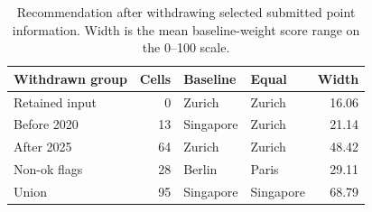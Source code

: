 \begin{table}[!ht]\centering
\caption{Recommendation after withdrawing selected submitted point information. Width is the mean baseline-weight score range on the 0--100 scale.}\label{tab:vintage}
\begin{tabular}{l r l l r}\toprule
Withdrawn group & Cells & Baseline & Equal & Width\\\midrule
Retained input & 0 & Zurich & Zurich & 16.06 \\
Before 2020 & 13 & Singapore & Zurich & 21.14 \\
After 2025 & 64 & Zurich & Zurich & 48.42 \\
Non-ok flags & 28 & Berlin & Paris & 29.11 \\
Union & 95 & Singapore & Singapore & 68.79 \\
\bottomrule\end{tabular}\end{table}
